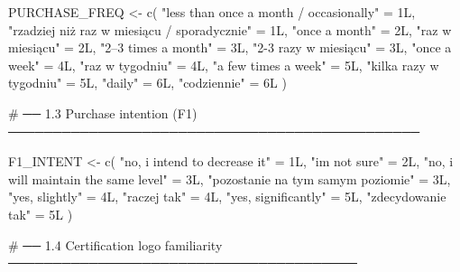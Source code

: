 \documentclass[
  letterpaper,
  DIV=11,
  numbers=noendperiod]{scrartcl}
\newenvironment{Shaded}{\begin{snugshade}}{\end{snugshade}}
\newcommand{\CommentTok}[1]{\textcolor[rgb]{0.37,0.37,0.37}{#1}}
\newcommand{\DecValTok}[1]{\textcolor[rgb]{0.68,0.00,0.00}{#1}}
\newcommand{\FunctionTok}[1]{\textcolor[rgb]{0.28,0.35,0.67}{#1}}
\newcommand{\NormalTok}[1]{\textcolor[rgb]{0.00,0.23,0.31}{#1}}
\newcommand{\OtherTok}[1]{\textcolor[rgb]{0.00,0.23,0.31}{#1}}
\newcommand{\StringTok}[1]{\textcolor[rgb]{0.13,0.47,0.30}{#1}}
\begin{document}
\begin{Shaded}
\begin{Highlighting}[]
\NormalTok{PURCHASE\_FREQ }\OtherTok{\textless{}{-}} \FunctionTok{c}\NormalTok{(}
  \StringTok{"less than once a month / occasionally"}               \OtherTok{=} \DecValTok{1}\NormalTok{L,}
  \StringTok{"rzadziej niż raz w miesiącu / sporadycznie"}          \OtherTok{=} \DecValTok{1}\NormalTok{L,}
  \StringTok{"once a month"}                                        \OtherTok{=} \DecValTok{2}\NormalTok{L,}
  \StringTok{"raz w miesiącu"}                                      \OtherTok{=} \DecValTok{2}\NormalTok{L,}
  \StringTok{"2–3 times a month"}                                   \OtherTok{=} \DecValTok{3}\NormalTok{L,}
  \StringTok{"2{-}3 razy w miesiącu"}                                 \OtherTok{=} \DecValTok{3}\NormalTok{L,}
  \StringTok{"once a week"}                                         \OtherTok{=} \DecValTok{4}\NormalTok{L,}
  \StringTok{"raz w tygodniu"}                                      \OtherTok{=} \DecValTok{4}\NormalTok{L,}
  \StringTok{"a few times a week"}                                  \OtherTok{=} \DecValTok{5}\NormalTok{L,}
  \StringTok{"kilka razy w tygodniu"}                               \OtherTok{=} \DecValTok{5}\NormalTok{L,}
  \StringTok{"daily"}                                               \OtherTok{=} \DecValTok{6}\NormalTok{L,}
  \StringTok{"codziennie"}                                          \OtherTok{=} \DecValTok{6}\NormalTok{L}
\NormalTok{)}

\CommentTok{\# ── 1.3  Purchase intention (F1) ──────────────────────────────────────────────}

\NormalTok{F1\_INTENT }\OtherTok{\textless{}{-}} \FunctionTok{c}\NormalTok{(}
  \StringTok{"no, i intend to decrease it"}      \OtherTok{=} \DecValTok{1}\NormalTok{L,}
  \StringTok{"i\textquotesingle{}m not sure"}                     \OtherTok{=} \DecValTok{2}\NormalTok{L,}
  \StringTok{"no, i will maintain the same level"} \OtherTok{=} \DecValTok{3}\NormalTok{L,}
  \StringTok{"pozostanie na tym samym poziomie"} \OtherTok{=} \DecValTok{3}\NormalTok{L,}
  \StringTok{"yes, slightly"}                    \OtherTok{=} \DecValTok{4}\NormalTok{L,}
  \StringTok{"raczej tak"}                       \OtherTok{=} \DecValTok{4}\NormalTok{L,}
  \StringTok{"yes, significantly"}               \OtherTok{=} \DecValTok{5}\NormalTok{L,}
  \StringTok{"zdecydowanie tak"}                 \OtherTok{=} \DecValTok{5}\NormalTok{L}
\NormalTok{)}



\CommentTok{\# ── 1.4  Certification logo familiarity ───────────────────────────────────────}


\end{Highlighting}
\end{Shaded}
\end{document}
